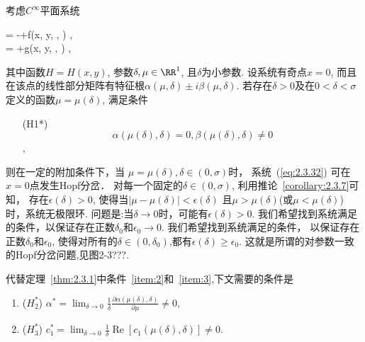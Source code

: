 考虑$C^{\infty}$平面系统
\begin{ode}
  \label{eq:2.3.32}
  \dxdt = -+\delta f(x, y, \mu, \delta)  ,\\
  \dydt = +\delta g(x, y, \mu, \delta) ,
\end{ode}
其中函数$H=H(x,y)$,
参数$\delta,\mu \in \RR^1$,
且$\delta$为小参数.
设系统有奇点$x=0$,
而且在该点的线性部分矩阵有特征根$\alpha(\mu,\delta)\pm i \beta(\mu,\delta)$.
若存在$\delta>0$及在$0<\delta<\sigma$定义的函数$\mu=\mu(\delta)$,
满足条件
\begin{enumerate}
\item[(H1*)]\label{item:14}
  $$\alpha(\mu(\delta),\delta)=0,\beta(\mu(\delta),\delta) \neq 0$$,
\end{enumerate}
则在一定的附加条件下，当
$\mu=\mu(\delta),\delta \in (0,\sigma)$时，
系统~(\ref{eq:2.3.32})
可在$x=0$点发生Hopf分岔．
对每一个固定的$\delta \in (0,\sigma)$,
利用推论~\ref{corollary:2.3.7}可知，
存在$\epsilon(\delta)>0$,
使得当$|\mu-\mu(\delta)|<\epsilon(\delta)$
且$\mu>\mu(\delta)$(或$\mu<\mu(\delta)$)时，系统无极限环.
问题是:当$\delta \to 0$时，可能有$\epsilon(\delta)>0$.
我们希望找到系统满足的条件，以保证存在正数$\delta_0$和$\epsilon_0 \to 0$.
我们希望找到系统满足的条件，
以保证存在正数$\delta_0$和$\epsilon_0$,
使得对所有的$\delta\in (0,\delta_{0})$,都有$\epsilon(\delta)\geqslant \epsilon_0$.
这就是所谓的对参数一致的Hopf分岔问题,见图2-3???.

代替定理~\ref{thm:2.3.1}中条件~\ref{item:2}和~\ref{item:3},下文需要的条件是
\begin{enumerate}
\item\label{item:15}  ($H_2^*$) $
\alpha^{*}=\lim _{\delta \rightarrow 0} \frac{1}{\delta} \frac{\partial \alpha(\mu(\delta), \delta)}{\partial \mu} \neq 0,
$
\item\label{item:16}  ($H_3^*$)
  $c_{1}^{*}=\lim _{\delta \rightarrow 0} \frac{1}{\delta} \operatorname{Re}\left[c_{1}(\mu(\delta), \delta)\right] \neq 0.$
\end{enumerate}

